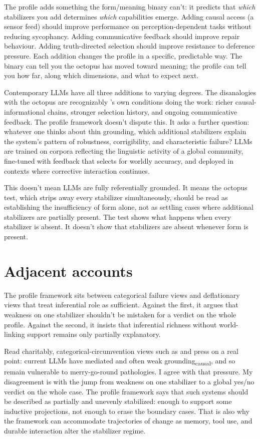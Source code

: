 \documentclass[12pt]{article}
\newcommand{\gcausal}{grounding\textsubscript{causal}}
\begin{document}
The profile adds something the form/meaning binary can't: it predicts that \emph{which} stabilizers you add determines \emph{which} capabilities emerge. Adding causal access (a sensor feed) should improve performance on perception-dependent tasks without reducing sycophancy. Adding communicative feedback should improve repair behaviour. Adding truth-directed selection should improve resistance to deference pressure. Each addition changes the profile in a specific, predictable way. The binary can tell you the octopus has moved toward meaning; the profile can tell you how far, along which dimensions, and what to expect next.

Contemporary LLMs have all three additions to varying degrees. The disanalogies with the octopus are recognizably \textcite{coelho_mollo_milliere_2026_vector_grounding_problem}'s own conditions doing the work: richer causal-informational chains, stronger selection history, and ongoing communicative feedback. The profile framework doesn't dispute this. It asks a further question: whatever one thinks about thin grounding, which additional stabilizers explain the system's pattern of robustness, corrigibility, and characteristic failure? LLMs are trained on corpora reflecting the linguistic activity of a global community, fine-tuned with feedback that selects for worldly accuracy, and deployed in contexts where corrective interaction continues.

This doesn't mean LLMs are fully referentially grounded. It means the octopus test, which strips away every stabilizer simultaneously, should be read as establishing the insufficiency of form alone, not as settling cases where additional stabilizers are partially present. The test shows what happens when every stabilizer is absent. It doesn't show that stabilizers are absent whenever form is present.

\section{Adjacent accounts}
\label{sec:adjacent}

The profile framework sits between categorical failure views and deflationary views that treat inferential role as sufficient. Against the first, it argues that weakness on one stabilizer shouldn't be mistaken for a verdict on the whole profile. Against the second, it insists that inferential richness without world-linking support remains only partially explanatory.

Read charitably, categorical-circumvention views such as \textcite{floridi_jia_tohme_2025_categorical_analysis_llms} and \textcite{manheim_2026_hall_of_mirrors_peircean} press on a real point: current LLMs have mediated and often weak \gcausal{}, and so remain vulnerable to merry-go-round pathologies. I agree with that pressure. My disagreement is with the jump from weakness on one stabilizer to a global yes/no verdict on the whole case. The profile framework says that such systems should be described as partially and unevenly stabilized: enough to support some inductive projections, not enough to erase the boundary cases. That is also why the framework can accommodate trajectories of change as memory, tool use, and durable interaction alter the stabilizer regime.
\end{document}
